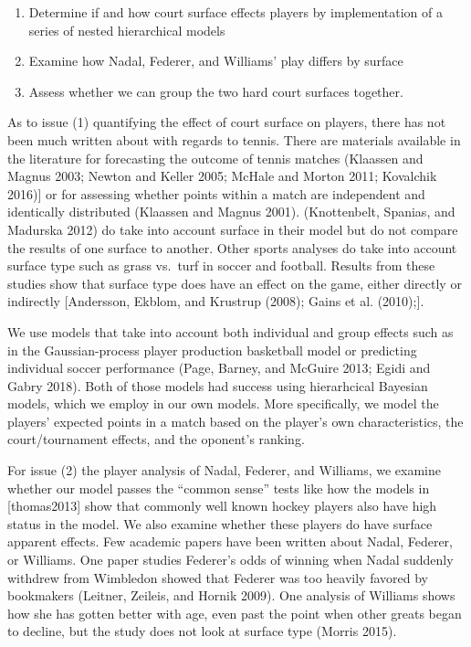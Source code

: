 \documentclass[]{article}
\begin{document}
\begin{enumerate}
\def\labelenumi{\arabic{enumi}.}
\item
  Determine if and how court surface effects players by implementation
  of a series of nested hierarchical models
\item
  Examine how Nadal, Federer, and Williams' play differs by surface
\item
  Assess whether we can group the two hard court surfaces together.
\end{enumerate}

As to issue (1) quantifying the effect of court surface on players,
there has not been much written about with regards to tennis. There are
materials available in the literature for forecasting the outcome of
tennis matches (Klaassen and Magnus 2003; Newton and Keller 2005; McHale
and Morton 2011; Kovalchik 2016){]} or for assessing whether points
within a match are independent and identically distributed (Klaassen and
Magnus 2001). (Knottenbelt, Spanias, and Madurska 2012) do take into
account surface in their model but do not compare the results of one
surface to another. Other sports analyses do take into account surface
type such as grass vs.~turf in soccer and football. Results from these
studies show that surface type does have an effect on the game, either
directly or indirectly {[}Andersson, Ekblom, and Krustrup (2008); Gains
et al. (2010);{]}.

We use models that take into account both individual and group effects
such as in the Gaussian-process player production basketball model or
predicting individual soccer performance (Page, Barney, and McGuire
2013; Egidi and Gabry 2018). Both of those models had success using
hierarhcical Bayesian models, which we employ in our own models. More
specifically, we model the players' expected points in a match based on
the player's own characteristics, the court/tournament effects, and the
oponent's ranking.

For issue (2) the player analysis of Nadal, Federer, and Williams, we
examine whether our model passes the ``common sense'' tests like how the
models in {[}thomas2013{]} show that commonly well known hockey players
also have high status in the model. We also examine whether these
players do have surface apparent effects. Few academic papers have been
written about Nadal, Federer, or Williams. One paper studies Federer's
odds of winning when Nadal suddenly withdrew from Wimbledon showed that
Federer was too heavily favored by bookmakers (Leitner, Zeileis, and
Hornik 2009). One analysis of Williams shows how she has gotten better
with age, even past the point when other greats began to decline, but
the study does not look at surface type (Morris 2015).
\end{document}
